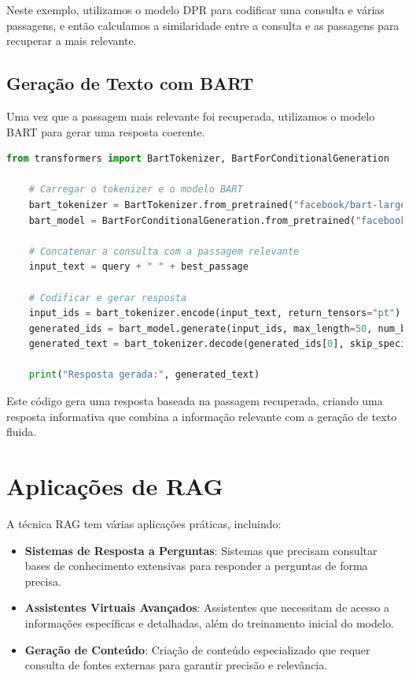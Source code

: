 \documentclass[14pt,a4paper,oneside]{book}
\begin{document}
Neste exemplo, utilizamos o modelo DPR para codificar uma consulta e várias passagens, e então calculamos a similaridade entre a consulta e as passagens para recuperar a mais relevante.

\subsection{Geração de Texto com BART}

Uma vez que a passagem mais relevante foi recuperada, utilizamos o modelo BART para gerar uma resposta coerente.

\begin{lstlisting}[language=Python]
	from transformers import BartTokenizer, BartForConditionalGeneration
	
	# Carregar o tokenizer e o modelo BART
	bart_tokenizer = BartTokenizer.from_pretrained("facebook/bart-large")
	bart_model = BartForConditionalGeneration.from_pretrained("facebook/bart-large")
	
	# Concatenar a consulta com a passagem relevante
	input_text = query + " " + best_passage
	
	# Codificar e gerar resposta
	input_ids = bart_tokenizer.encode(input_text, return_tensors="pt")
	generated_ids = bart_model.generate(input_ids, max_length=50, num_beams=4, early_stopping=True)
	generated_text = bart_tokenizer.decode(generated_ids[0], skip_special_tokens=True)
	
	print("Resposta gerada:", generated_text)
\end{lstlisting}

Este código gera uma resposta baseada na passagem recuperada, criando uma resposta informativa que combina a informação relevante com a geração de texto fluida.

\section{Aplicações de RAG}

A técnica RAG tem várias aplicações práticas, incluindo:

\begin{itemize}
	\item \textbf{Sistemas de Resposta a Perguntas}: Sistemas que precisam consultar bases de conhecimento extensivas para responder a perguntas de forma precisa.
	\item \textbf{Assistentes Virtuais Avançados}: Assistentes que necessitam de acesso a informações específicas e detalhadas, além do treinamento inicial do modelo.
	\item \textbf{Geração de Conteúdo}: Criação de conteúdo especializado que requer consulta de fontes externas para garantir precisão e relevância.
\end{itemize}
\end{document}

